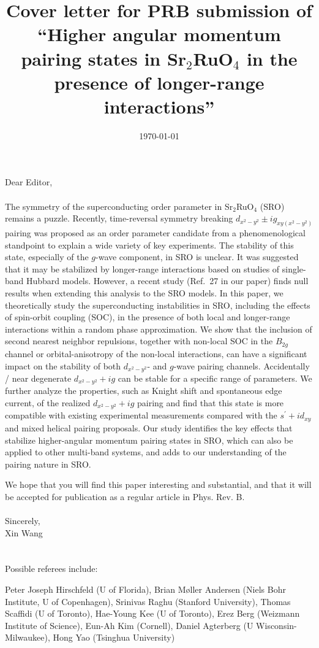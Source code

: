 \documentclass[11pt, oneside]{article}   	%
\title{Cover letter for PRB submission of ``Higher angular momentum pairing states in Sr$_2$RuO$_4$ in the presence of longer-range interactions''}
\author{}
\date{\today}
\begin{document}
\maketitle
\noindent
Dear Editor, \\\\
The symmetry of the superconducting order parameter in Sr$_2$RuO$_4$ (SRO) remains a puzzle. 
Recently, time-reversal symmetry breaking $d_{x^2-y^2} \pm i g_{xy(x^2-y^2)}$ pairing was proposed as an order parameter candidate from a phenomenological standpoint to explain a wide variety of key experiments.
The stability of this state, especially of the $g$-wave component, in SRO is unclear. 
It was suggested that it may be stabilized by longer-range interactions based on studies of single-band Hubbard models.  However, a recent study (Ref.~27 in our paper) finds null results when extending this analysis to the SRO models. 
In this paper, we theoretically study the superconducting instabilities in SRO, including the effects of spin-orbit coupling (SOC), in the presence of both local and longer-range interactions within a random phase approximation. 
We show that the inclusion of second nearest neighbor repulsions, together with non-local SOC in the $B_{2g}$ channel or orbital-anisotropy of the non-local interactions, can have a significant impact on the stability of both $d_{x^2-y^2}$- and $g$-wave pairing channels. 
Accidentally / near degenerate $d_{x^2-y^2}+ig$ can be stable for a specific range of parameters.
We further analyze the properties, such as Knight shift and spontaneous edge current, of the realized $d_{x^2-y^2} + ig$ pairing and find that this state is more compatible with existing experimental measurements compared with the $s^{\prime}+id_{xy}$ and mixed helical pairing proposals. 
Our study identifies the key effects that stabilize higher-angular momentum pairing states in SRO, which can also be applied to other multi-band systems, and adds to our understanding of the pairing nature in SRO. 

\noindent
We hope that you will find this paper interesting and substantial, and that it will be accepted for publication as a regular article in Phys. Rev. B. \\\\
\noindent
Sincerely, \\
\noindent
Xin Wang\\
\\\\
\noindent
Possible referees include: \\
\noindent

Peter Joseph Hirschfeld (U of Florida), 
Brian M{\o}ller Andersen (Niels Bohr Institute, U of Copenhagen), 
Srinivas Raghu (Stanford University), 
Thomas Scaffidi (U of Toronto), 
Hae-Young Kee (U of Toronto),
Erez Berg (Weizmann Institute of Science), 
Eun-Ah Kim (Cornell), 
Daniel Agterberg (U Wisconsin-Milwaukee), 
Hong Yao (Tsinghua University)
\end{document}
